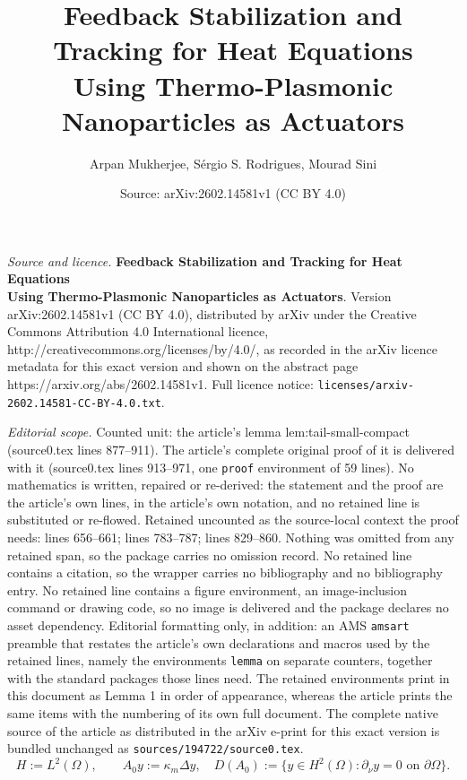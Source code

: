 \documentclass[10pt,a4paper]{amsart}
\title{\Large \textbf{Feedback Stabilization and Tracking for Heat Equations}\\ \textbf{Using Thermo-Plasmonic Nanoparticles as Actuators}}
\author{Arpan Mukherjee, S\'ergio S. Rodrigues, Mourad Sini}
\date{Source: arXiv:2602.14581v1 (CC BY 4.0)}
\newcommand{\Om}{\Omega}
\newcommand{\kappam}{\kappa_m}
\begin{document}
\maketitle

\noindent\emph{Source and licence.} \Large \textbf{Feedback Stabilization and Tracking for Heat Equations}\\ \textbf{Using Thermo-Plasmonic Nanoparticles as Actuators}. Version arXiv:2602.14581v1 (CC BY 4.0), distributed by arXiv under the Creative Commons Attribution 4.0 International licence, http://creativecommons.org/licenses/by/4.0/, as recorded in the arXiv licence metadata for this exact version and shown on the abstract page https://arxiv.org/abs/2602.14581v1. Full licence notice: \texttt{licenses/arxiv-2602.14581-CC-BY-4.0.txt}.\par\smallskip

\noindent\textit{Editorial scope.} Counted unit: the article's lemma lem:tail-small-compact (source0.tex lines 877--911). The article's complete original proof of it is delivered with it (source0.tex lines 913--971, one \texttt{proof} environment of 59 lines). No mathematics is written, repaired or re-derived: the statement and the proof are the article's own lines, in the article's own notation, and no retained line is substituted or re-flowed.  Retained uncounted as the source-local context the proof needs: lines 656--661; lines 783--787; lines 829--860.  Nothing was omitted from any retained span, so the package carries no omission record.  No retained line contains a citation, so the wrapper carries no bibliography and no bibliography entry.  No retained line contains a figure environment, an image-inclusion command or drawing code, so no image is delivered and the package declares no asset dependency.  Editorial formatting only, in addition: an AMS \texttt{amsart} preamble that restates the article's own declarations and macros used by the retained lines, namely the environments \texttt{lemma} on separate counters, together with the standard packages those lines need.  The retained environments print in this document as Lemma 1 in order of appearance, whereas the article prints the same items with the numbering of its own full document.  The complete native source of the article as distributed in the arXiv e-print for this exact version is bundled unchanged as \texttt{sources/194722/source0.tex}.
\begin{equation}
\label{eq:3.2}
H := L^2(\Om),\qquad
A_0 y := \kappam\Delta y,\quad
D(A_0) := \{ y\in H^2(\Om): \partial_\nu y = 0 \text{ on }\partial\Om\}.
\end{equation}
\end{document}
